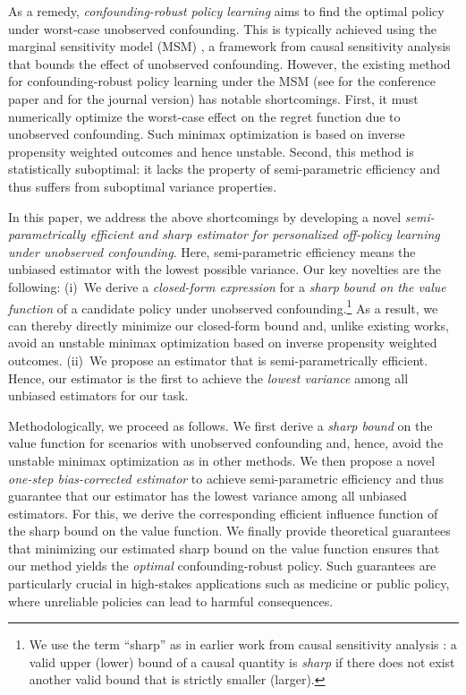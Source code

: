 \documentclass{article} %
\theoremstyle{plain}
\theoremstyle{definition}
\theoremstyle{remark}
\begin{document}
As a remedy, \emph{confounding-robust policy learning} aims to find the optimal policy under worst-case unobserved confounding. This is typically achieved using the marginal sensitivity model (MSM) \citep{Tan.2006}, a framework from causal sensitivity analysis that bounds the effect of unobserved confounding. However, the existing method for confounding-robust policy learning under the MSM (see \citep{Kallus.2018c} for the conference paper and \citep{Kallus.2021d} for the journal version) has notable shortcomings. First, it must numerically optimize the worst-case effect on the regret function due to unobserved confounding. Such minimax optimization is based on inverse propensity weighted outcomes and hence unstable. Second, this method is statistically suboptimal: it lacks the property of semi-parametric efficiency and thus suffers from suboptimal variance properties.

In this paper, we address the above shortcomings by developing a novel \emph{semi-parametrically efficient and sharp estimator for personalized off-policy learning under unobserved confounding}. Here, semi-parametric efficiency means the unbiased estimator with the lowest possible variance. Our key novelties are the following: (i)~We derive a \emph{closed-form expression} for a \emph{sharp bound on the value function} of a candidate policy under unobserved confounding.\footnote{We use the term ``sharp'' as in earlier work from causal sensitivity analysis \citep{Frauen.2023c}: a valid upper (lower) bound of a causal quantity is \emph{sharp} if there does not exist another valid bound that is strictly smaller (larger).} As a result, we can thereby directly minimize our closed-form bound and, unlike existing works, avoid an unstable minimax optimization based on inverse propensity weighted outcomes. (ii)~We propose an estimator that is semi-parametrically efficient. Hence, our estimator is the first to achieve the \emph{lowest variance} among all unbiased estimators for our task.


Methodologically, we proceed as follows. We first derive a \emph{sharp bound} on the value function for scenarios with unobserved confounding and, hence, avoid the unstable minimax optimization as in other methods. We then propose a novel \emph{one-step bias-corrected estimator} to achieve semi-parametric efficiency and thus guarantee that our estimator has the lowest variance among all unbiased estimators.  For this, we derive the corresponding {efficient influence function} of the sharp bound on the value function. We finally provide theoretical guarantees that minimizing our estimated sharp bound on the value function ensures that our method yields the \emph{optimal} confounding-robust policy. Such guarantees are particularly crucial in high-stakes applications such as medicine or public policy, where unreliable policies can lead to harmful consequences.  
\end{document}
